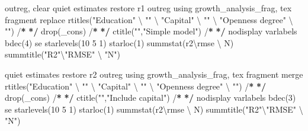\documentclass[
  12pt,
]{article}
\newenvironment{Shaded}{\begin{snugshade}}{\end{snugshade}}
\newcommand{\DecValTok}[1]{\textcolor[rgb]{0.00,0.00,0.81}{#1}}
\newcommand{\ErrorTok}[1]{\textcolor[rgb]{0.64,0.00,0.00}{\textbf{#1}}}
\newcommand{\FunctionTok}[1]{\textcolor[rgb]{0.00,0.00,0.00}{#1}}
\newcommand{\NormalTok}[1]{#1}
\newcommand{\SpecialCharTok}[1]{\textcolor[rgb]{0.00,0.00,0.00}{#1}}
\newcommand{\StringTok}[1]{\textcolor[rgb]{0.31,0.60,0.02}{#1}}
\begin{document}
\begin{Shaded}
\begin{Highlighting}[]
\NormalTok{outreg, clear}
\NormalTok{    quiet estimates restore r1}
\NormalTok{        outreg using growth\_analysis\_frag, tex fragment replace }\FunctionTok{rtitles}\NormalTok{(}\StringTok{"Education"}\NormalTok{ \textbackslash{} }\StringTok{""}\NormalTok{ \textbackslash{} }\StringTok{"Capital"}\NormalTok{ \textbackslash{} }\StringTok{""}\NormalTok{ \textbackslash{} }\StringTok{"Openness degree"}\NormalTok{ \textbackslash{} }\StringTok{""}\NormalTok{)  }\SpecialCharTok{/}\ErrorTok{*}
                \ErrorTok{*/} \FunctionTok{drop}\NormalTok{(\_cons) }\SpecialCharTok{/}\ErrorTok{*}
                \ErrorTok{*/} \FunctionTok{ctitle}\NormalTok{(}\StringTok{""}\NormalTok{,}\StringTok{"Simple model"}\NormalTok{) }\SpecialCharTok{/}\ErrorTok{*}
                \ErrorTok{*/}\NormalTok{ nodisplay varlabels }\FunctionTok{bdec}\NormalTok{(}\DecValTok{4}\NormalTok{) se }\FunctionTok{starlevels}\NormalTok{(}\DecValTok{10} \DecValTok{5} \DecValTok{1}\NormalTok{) }\FunctionTok{starloc}\NormalTok{(}\DecValTok{1}\NormalTok{) }\FunctionTok{summstat}\NormalTok{(r2\textbackslash{}rmse \textbackslash{} N) }\FunctionTok{summtitle}\NormalTok{(}\StringTok{"R2"}\NormalTok{\textbackslash{}}\StringTok{"RMSE"}\NormalTok{ \textbackslash{} }\StringTok{"N"}\NormalTok{)}

\NormalTok{    quiet estimates restore r2}
\NormalTok{        outreg using growth\_analysis\_frag, tex fragment merge }\FunctionTok{rtitles}\NormalTok{(}\StringTok{"Education"}\NormalTok{ \textbackslash{} }\StringTok{""}\NormalTok{ \textbackslash{} }\StringTok{"Capital"}\NormalTok{ \textbackslash{} }\StringTok{""}\NormalTok{ \textbackslash{} }\StringTok{"Openness degree"}\NormalTok{ \textbackslash{} }\StringTok{""}\NormalTok{)  }\SpecialCharTok{/}\ErrorTok{*}
                \ErrorTok{*/} \FunctionTok{drop}\NormalTok{(\_cons) }\SpecialCharTok{/}\ErrorTok{*}
                \ErrorTok{*/} \FunctionTok{ctitle}\NormalTok{(}\StringTok{""}\NormalTok{,}\StringTok{"Include capital"}\NormalTok{) }\SpecialCharTok{/}\ErrorTok{*}
                \ErrorTok{*/}\NormalTok{ nodisplay varlabels }\FunctionTok{bdec}\NormalTok{(}\DecValTok{3}\NormalTok{) se }\FunctionTok{starlevels}\NormalTok{(}\DecValTok{10} \DecValTok{5} \DecValTok{1}\NormalTok{) }\FunctionTok{starloc}\NormalTok{(}\DecValTok{1}\NormalTok{) }\FunctionTok{summstat}\NormalTok{(r2\textbackslash{}rmse \textbackslash{} N) }\FunctionTok{summtitle}\NormalTok{(}\StringTok{"R2"}\NormalTok{\textbackslash{}}\StringTok{"RMSE"}\NormalTok{ \textbackslash{} }\StringTok{"N"}\NormalTok{)}


\end{Highlighting}
\end{Shaded}
\end{document}
